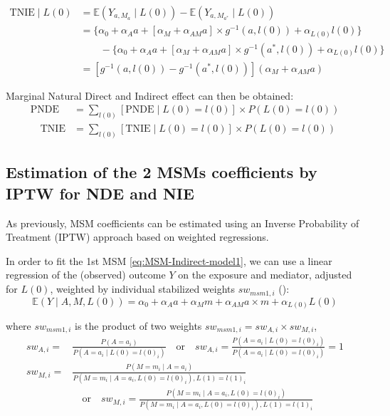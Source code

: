 \documentclass[
]{book}
\begin{document}
\begin{align*}
  \text{TNIE} \mid L(0) &= \mathbb{E}(Y_{a,M_{a}} \mid L(0)) - \mathbb{E}(Y_{a,M_{a^*}} \mid L(0)) \\
  &= \{\alpha_0 + \alpha_A a + [\alpha_M + \alpha_{AM}a] \times g^{-1}(a,l(0)) + \alpha_{L(0)} l(0) \} \\
  & \quad \quad - \{ \alpha_0 + \alpha_A a+ [\alpha_M + \alpha_{AM}a] \times g^{-1}(a^*,l(0)) + \alpha_{L(0)} l(0) \} \\
  &= \left[ g^{-1}(a,l(0)) - g^{-1}(a^*,l(0)) \right](\alpha_M + \alpha_{AM} a)
\end{align*}

Marginal Natural Direct and Indirect effect can then be obtained:
\begin{align*}
  \text{PNDE} &= \sum_{l(0)} \left[ \text{PNDE} \mid L(0) = l(0) \right] \times P(L(0)=l(0)) \\
  \quad \text{TNIE} &= \sum_{l(0)} \left[ \text{TNIE} \mid L(0) = l(0) \right] \times P(L(0)=l(0))
\end{align*}

\subsection{Estimation of the 2 MSMs coefficients by IPTW for NDE and NIE}\label{estimation-of-the-2-msms-coefficients-by-iptw-for-nde-and-nie}

As previously, MSM coefficients can be estimated using an Inverse Probability of Treatment (IPTW) approach based on weighted regressions.

In order to fit the 1st MSM \eqref{eq:MSM-Indirect-model1}, we can use a linear regression of the (observed) outcome \(Y\) on the exposure and mediator, adjusted for \(L(0)\), weighted by individual stabilized weights \(sw_{msm1,i}\) ():
\begin{equation*} 
  \mathbb{E}\left(Y \mid A,M,L(0)\right) = \alpha_0 + \alpha_A a + \alpha_M m + \alpha_{AM} a \times m + \alpha_{L(0)} L(0)
\end{equation*}

where \(sw_{msm1,i}\) is the product of two weights \(sw_{msm1,i} = sw_{A,i} \times sw_{M,i}\),
\begin{align*}
  sw_{A,i} =& \frac{P(A=a_i)}{P(A=a_i \mid L(0)=l(0)_i)} \quad \text{or} \quad sw_{A,i} = \frac{P(A=a_i \mid L(0)=l(0)_i)}{P(A=a_i \mid L(0)=l(0)_i)} = 1 \\
  sw_{M,i} =& \frac{P(M=m_i \mid A=a_i)}{P(M = m_i \mid A=a_i,L(0)=l(0)_i), L(1)=l(1)_i} \\
  & \quad \text{or} \quad sw_{M,i} = \frac{P(M=m_i \mid A=a_i,L(0)=l(0)_i)}{P(M = m_i \mid A=a_i,L(0)=l(0)_i), L(1)=l(1)_i} \\
\end{align*}
\end{document}
